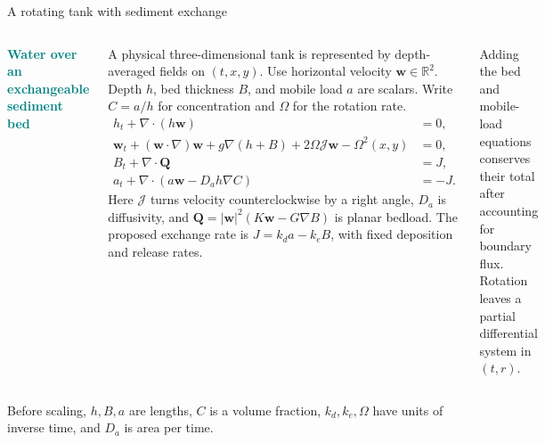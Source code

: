 \documentclass[aspectratio=169,11pt]{beamer}
\newcommand{\smallnote}[1]{{\footnotesize\color{muted}#1\par}}
\newcommand{\lead}[1]{\textcolor{teal}{\textbf{#1}}}
\newcommand{\R}{\mathbb R}
\begin{document}
\begin{frame}[t]{A rotating tank with sediment exchange}
\vspace{.5mm}
\begin{columns}[T,onlytextwidth]
\lead{Water over an exchangeable sediment bed}\par
\small A physical three-dimensional tank is represented by depth-averaged fields on $(t,x,y)$. Use horizontal velocity $\mathbf w\in\R^2$. Depth $h$, bed thickness $B$, and mobile load $a$ are scalars. Write $C=a/h$ for concentration and $\Omega$ for the rotation rate.
\begin{align*}
 h_t+\nabla\cdot(h\mathbf w)&=0,\\
 \mathbf w_t+(\mathbf w\cdot\nabla)\mathbf w+g\nabla(h+B)
       +2\Omega\mathcal J\mathbf w-\Omega^2(x,y)&=0,\\
 B_t+\nabla\cdot\mathbf Q&=J,\\
 a_t+\nabla\cdot(a\mathbf w-D_a h\nabla C)&=-J.
\end{align*}
Here $\mathcal J$ turns velocity counterclockwise by a right angle, $D_a$ is diffusivity, and $\mathbf Q=|\mathbf w|^2(K\mathbf w-G\nabla B)$ is planar bedload. The proposed exchange rate is $J=k_da-k_eB$, with fixed deposition and release rates.
\centering
{}\par\smallskip
\raggedright
\smallnote{Adding the bed and mobile-load equations conserves their total after accounting for boundary flux. Rotation leaves a partial differential system in $(t,r)$.}
\end{columns}
\vspace{1mm}
\smallnote{Before scaling, $h,B,a$ are lengths, $C$ is a volume fraction, $k_d,k_e,\Omega$ have units of inverse time, and $D_a$ is area per time.}
\end{frame}
\end{document}
